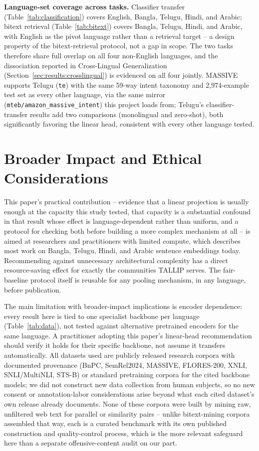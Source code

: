 \documentclass[manuscript]{acmart}
\begin{document}
\textbf{Language-set coverage across tasks.} Classifier transfer (Table~\ref{tab:classification}) covers English, Bangla, Telugu, Hindi, and Arabic; bitext retrieval (Table~\ref{tab:bitext}) covers Bangla, Telugu, Hindi, and Arabic, with English as the pivot language rather than a retrieval target -- a design property of the bitext-retrieval protocol, not a gap in scope. The two tasks therefore share full overlap on all four non-English languages, and the dissociation reported in Cross-Lingual Generalization (Section~\ref{sec:results:crosslingual}) is evidenced on all four jointly. MASSIVE~\citep{fitzgerald2022massive} supports Telugu (\texttt{te}) with the same 59-way intent taxonomy and 2,974-example test set as every other language, via the same mirror (\texttt{mteb/amazon\_massive\_intent}) this project loads from; Telugu's classifier-transfer results add two comparisons (monolingual and zero-shot), both significantly favoring the linear head, consistent with every other language tested.

\section{Broader Impact and Ethical Considerations}

This paper's practical contribution -- evidence that a linear projection is usually enough at the capacity this study tested, that capacity is a substantial confound in that result whose effect is language-dependent rather than uniform, and a protocol for checking both before building a more complex mechanism at all -- is aimed at researchers and practitioners with limited compute, which describes most work on Bangla, Telugu, Hindi, and Arabic sentence embeddings today. Recommending against unnecessary architectural complexity has a direct resource-saving effect for exactly the communities TALLIP serves. The fair-baseline protocol itself is reusable for any pooling mechanism, in any language, before publication.

The main limitation with broader-impact implications is encoder dependence: every result here is tied to one specialist backbone per language (Table~\ref{tab:data}), not tested against alternative pretrained encoders for the same language. A practitioner adopting this paper's linear-head recommendation should verify it holds for their specific backbone, not assume it transfers automatically. All datasets used are publicly released research corpora with documented provenance (BnPC, SemRel2024, MASSIVE, FLORES-200, XNLI, SNLI/MultiNLI, STS-B) or standard pretraining corpora for the cited backbone models; we did not construct new data collection from human subjects, so no new consent or annotation-labor considerations arise beyond what each cited dataset's own release already documents. None of these corpora were built by mining raw, unfiltered web text for parallel or similarity pairs -- unlike bitext-mining corpora assembled that way, each is a curated benchmark with its own published construction and quality-control process, which is the more relevant safeguard here than a separate offensive-content audit on our part.
\end{document}
